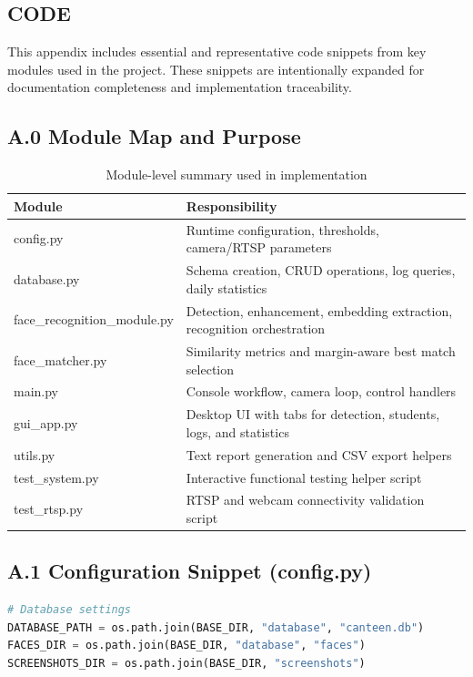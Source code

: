 \documentclass{fisatprojectfinal}
\begin{document}
\newpage
{}
\begin{appendices}

\chapter{CODE}
This appendix includes essential and representative code snippets from key modules used in the project. These snippets are intentionally expanded for documentation completeness and implementation traceability.

\section*{A.0 Module Map and Purpose}
\begin{table}[h!]
\centering
\caption{Module-level summary used in implementation}
\begin{tabular}{|l|l|}
\hline
Module & Responsibility \\
\hline
config.py & Runtime configuration, thresholds, camera/RTSP parameters \\
\hline
database.py & Schema creation, CRUD operations, log queries, daily statistics \\
\hline
face\_recognition\_module.py & Detection, enhancement, embedding extraction, recognition orchestration \\
\hline
face\_matcher.py & Similarity metrics and margin-aware best match selection \\
\hline
main.py & Console workflow, camera loop, control handlers \\
\hline
gui\_app.py & Desktop UI with tabs for detection, students, logs, and statistics \\
\hline
utils.py & Text report generation and CSV export helpers \\
\hline
test\_system.py & Interactive functional testing helper script \\
\hline
test\_rtsp.py & RTSP and webcam connectivity validation script \\
\hline
\end{tabular}
\end{table}

\section*{A.1 Configuration Snippet (config.py)}
\begin{lstlisting}[language=Python,caption={Core configuration for camera, RTSP, and recognition thresholds}]
# Database settings
DATABASE_PATH = os.path.join(BASE_DIR, "database", "canteen.db")
FACES_DIR = os.path.join(BASE_DIR, "database", "faces")
SCREENSHOTS_DIR = os.path.join(BASE_DIR, "screenshots")


\end{lstlisting}
\end{appendices}
\end{document}

